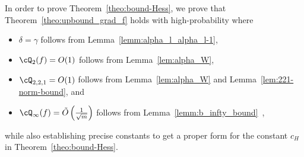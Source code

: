 In order to prove Theorem~\ref{theo:bound-Hess}, we prove that Theorem~\ref{theo:upbound_grad_f} holds with high-probability where 
\begin{itemize}
    \item $\delta= \gamma$ follows from Lemma~\ref{lemm:alpha_l_alpha_l-1},
    \item $\cQ_2(f) = O(1)$  follows from Lemma~\ref{lem:alpha_W},
    \item $\cQ_{2,2,1} = O(1)$ follows from Lemma~\ref{lem:alpha_W} and Lemma~\ref{lem:221-norm-bound}, and
    \item $\cQ_\infty(f) = \tilde{O}\left(\frac{1}{\sqrt{m}}\right)$ follows from Lemma~\ref{lemm:b_infty_bound}~,
\end{itemize}
while also establishing precise constants to get a proper form for the constant $c_H$ in Theorem~\ref{theo:bound-Hess}.





